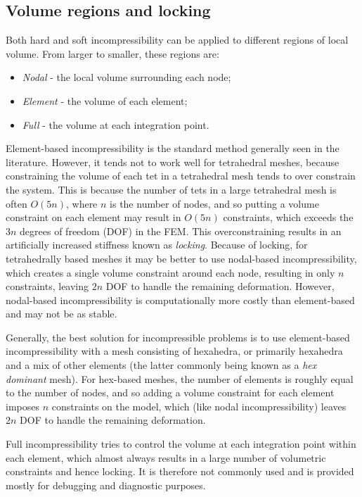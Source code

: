 \subsection{Volume regions and locking}
\label{VolumeRegions:sec}

Both hard and soft incompressibility can be applied to different
regions of local volume. From larger to smaller, these regions are:

\begin{itemize}
\item {\it Nodal} - the local volume surrounding each node;
\item {\it Element} - the volume of each element;
\item {\it Full} - the volume at each integration point.
\end{itemize}

Element-based incompressibility is the standard method generally seen
in the literature. However, it tends not to work well for
tetrahedral meshes, because constraining the volume of each tet in a
tetrahedral mesh tends to over constrain the system. This is because
the number of tets in a large tetrahedral mesh is often $O(5 n)$,
where $n$ is the number of nodes, and so putting a volume constraint
on each element may result in $O(5 n)$ constraints, which exceeds the
$3 n$ degrees of freedom (DOF) in the FEM. This overconstraining results in an
artificially increased stiffness known as \emph{locking}. Because of
locking, for tetrahedrally based meshes it may be better to use
nodal-based incompressibility, which creates a single volume constraint
around each node, resulting in only $n$ constraints, leaving $2 n$ DOF
to handle the remaining deformation.  However, nodal-based
incompressibility is computationally more costly than element-based
and may not be as stable.

Generally, the best solution for incompressible problems is to use
element-based incompressibility with a mesh consisting of hexahedra,
or primarily hexahedra and a mix of other elements (the latter
commonly being known as a \emph{hex dominant} mesh). For hex-based
meshes, the number of elements is roughly equal to the number of
nodes, and so adding a volume constraint for each element imposes $n$
constraints on the model, which (like nodal incompressibility)
leaves $2 n$ DOF to handle the remaining deformation.

Full incompressibility tries to control the volume at each
integration point within each element, which almost always results in
a large number of volumetric constraints and hence locking. It is
therefore not commonly used and is provided mostly for debugging and
diagnostic purposes.

